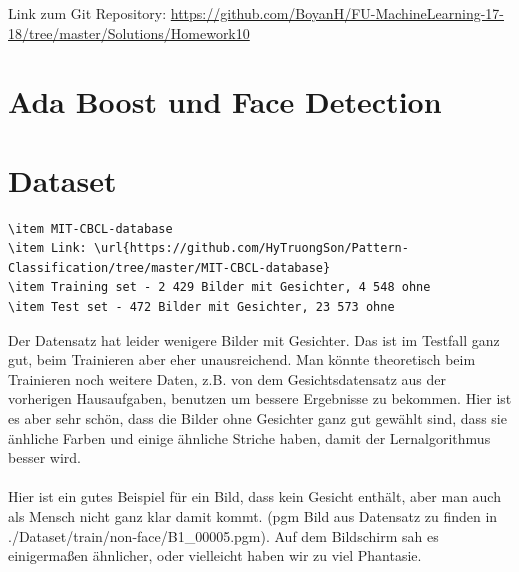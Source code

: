 \usepackage{graphicx}
\usepackage{amsmath}
\usepackage{amssymb}
\usepackage{fancyvrb}

\newcommand{\dozent}{Prof. R. Rojas}					%
\newcommand{\projectNo}{10}
\newcommand{\veranstaltung}{Mustererkennung}
\newcommand{\semester}{WS17/18}
\newcommand{\studenten}{Boyan Hristov, Nedeltscho Petrov}





Link zum Git Repository: \url{https://github.com/BoyanH/FU-MachineLearning-17-18/tree/master/Solutions/Homework\projectNo}

\section*{Ada Boost und Face Detection}


\section*{Dataset}

\begin{lstlisting}
\item MIT-CBCL-database
\item Link: \url{https://github.com/HyTruongSon/Pattern-Classification/tree/master/MIT-CBCL-database}
\item Training set - 2 429 Bilder mit Gesichter, 4 548 ohne
\item Test set - 472 Bilder mit Gesichter, 23 573 ohne
\end{lstlisting}

Der Datensatz hat leider wenigere Bilder mit Gesichter. Das ist im Testfall ganz gut, beim Trainieren aber
eher unausreichend. Man könnte theoretisch beim Trainieren noch weitere Daten, z.B. von dem Gesichtsdatensatz aus
der vorherigen Hausaufgaben, benutzen um bessere Ergebnisse zu bekommen. Hier ist es aber sehr schön, dass die
Bilder ohne Gesichter ganz gut gewählt sind, dass sie änhliche Farben und einige ähnliche Striche haben, damit der
Lernalgorithmus besser wird. \\ \\

Hier ist ein gutes Beispiel für ein Bild, dass kein Gesicht enthält, aber man auch als Mensch nicht ganz klar
damit kommt. (pgm Bild aus Datensatz zu finden in ./Dataset/train/non-face/B1\_00005.pgm). Auf dem Bildschirm
sah es einigermaßen ähnlicher, oder vielleicht haben wir zu viel Phantasie.

